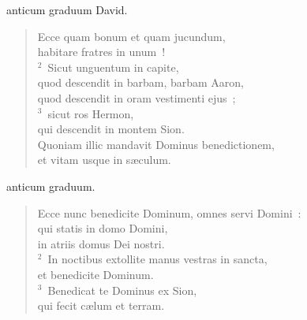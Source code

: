 


\bchapter[Psalm]
anticum graduum David. \begin{verse}Ecce quam bonum et quam jucundum,\\ habitare fratres in unum~!\\
${}^{2}$~Sicut unguentum in capite,\\ quod descendit in barbam, barbam Aaron,\\ quod descendit in oram vestimenti ejus~;\\
${}^{3}$~sicut ros Hermon,\\ qui descendit in montem Sion.\\ Quoniam illic mandavit Dominus benedictionem,\\ et vitam usque in s\ae culum.\end{verse}



\bchapter[Psalm]
anticum graduum. \begin{verse}Ecce nunc benedicite Dominum, omnes servi Domini~:\\ qui statis in domo Domini,\\ in atriis domus Dei nostri.\\
${}^{2}$~In noctibus extollite manus vestras in sancta,\\ et benedicite Dominum.\\
${}^{3}$~Benedicat te Dominus ex Sion,\\ qui fecit c\ae lum et terram.\end{verse}



